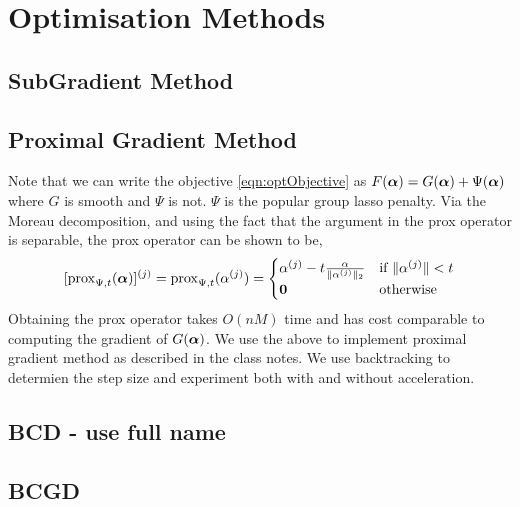 
\section{Optimisation Methods}
\label{sec:optMethods}

\subsection{SubGradient Method}


\subsection{Proximal Gradient Method}

Note that we can write the objective \eqref{eqn:optObjective} as $F({\bm{\alpha}}) =
G({\bm{\alpha}}) + \Psi({\bm{\alpha}})$ where $G$ is smooth and $\Psi$ is not. $\Psi$ is the
popular group lasso penalty. Via the Moreau decomposition, and using the fact
that the argument in the prox operator is separable, the prox operator can
be shown to be,
\[
[{\bf{\rm prox}}_{\Psi, t} ({\bm{\alpha}})]^{(j)} =
{\bf{\rm prox}}_{\Psi, t} (\alpha^{(j)}) = 
  \begin{cases}
    \alpha^{(j)} - t \frac{\alpha}{\|\alpha^{(j)}\|_2} & \text{if } 
              \|\alpha^{(j)}\| < t \\
    {\bf 0} & \text{otherwise}
  \end{cases}
\]
Obtaining the prox operator takes $O(nM)$ time and has cost comparable to
computing the gradient of $G({\bm{\alpha}})$. We use the above to implement proximal
gradient method as described in the class notes. We use backtracking to
determien the step size and experiment both with and without acceleration.


\subsection{BCD - use full name}


\subsection{BCGD}


